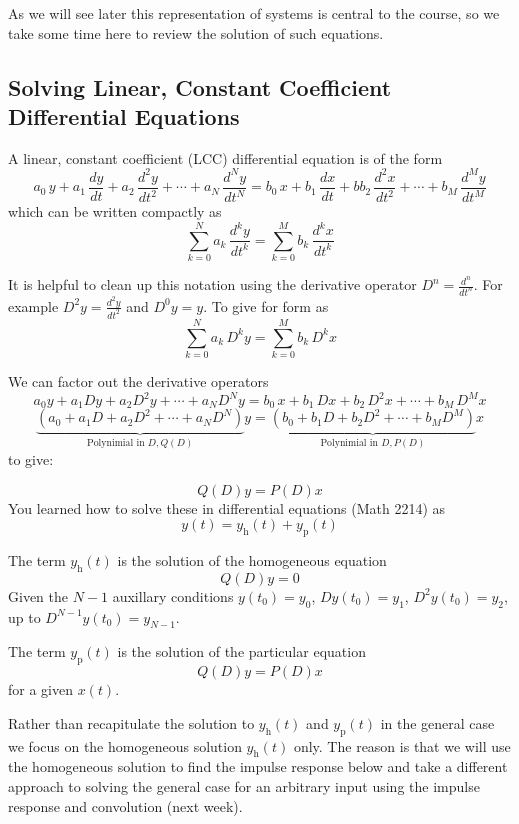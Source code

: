 As we will see later this representation of systems is central to the course, so we take some time here to review the solution of such equations.
 
\subsection{Solving Linear, Constant Coefficient Differential Equations}

A linear, constant coefficient (LCC) differential equation is of the form
\[
a_0\, y + a_1\, \frac{dy}{dt} + a_2\, \frac{d^2y}{dt^2} + \cdots + a_N\, \frac{d^Ny}{dt^N}  = b_0\, x + b_1\, \frac{dx}{dt} + bb_2\, \frac{d^2x}{dt^2} + \cdots + b_M\, \frac{d^My}{dt^M}
\]
which can be written compactly as
\[
\sum\limits_{k = 0}^{N} a_k\, \frac{d^ky}{dt^k} = \sum\limits_{k = 0}^{M} b_k\, \frac{d^kx}{dt^k}
\]

It is helpful to clean up this notation using the derivative operator $D^n = \frac{d^n}{dt^n}$. For example
$D^2y = \frac{d^2y}{dt^2}$ and $D^0 y= y$. To give for form as
\[
\sum\limits_{k = 0}^{N} a_k\, D^k y = \sum\limits_{k = 0}^{M} b_k\, D^k x
\]

We can factor out the derivative operators
\[
a_0y + a_1Dy + a_2D^2y + \cdots + a_ND^Ny  = b_0\, x + b_1\, Dx + b_2\, D^2x + \cdots + b_M\, D^M x
\]
\[
\underbrace{\left(a_0 + a_1D + a_2D^2 + \cdots + a_ND^N\right)}_{\text{Polynimial in } D, Q(D)} y = \underbrace{\left(b_0 + b_1 D + b_2 D^2 + \cdots + b_M D^M\right)}_{\text{Polynimial in } D, P(D)} x
\]
to give:
  
\[
Q(D)y = P(D)x
\]
You learned how to solve these in differential equations (Math 2214) as
\[
y(t) = y_\text{h}(t) + y_\text{p}(t)
\]

The term $y_\text{h}(t)$ is the solution of the homogeneous equation
\[
Q(D)y = 0
\]
Given the $N-1$ auxillary conditions $y(t_0) = y_0$, $Dy(t_0) = y_1$, $D^2y(t_0) = y_2$, up to $D^{N-1}y(t_0) = y_{N-1}$.

The term $y_\text{p}(t)$ is the solution of the particular equation
\[
Q(D)y = P(D)x
\]
for a given $x(t)$.

Rather than recapitulate the solution to $y_\text{h}(t)$ and $y_\text{p}(t)$ in the general case we focus on the homogeneous solution $y_\text{h}(t)$ only. The reason is that we will use the homogeneous solution to find the impulse response below and take a different approach to solving the general case for an arbitrary input using the impulse response and convolution (next week).

